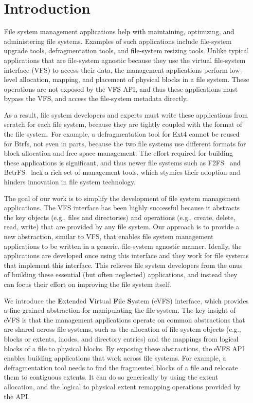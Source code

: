 \section{Introduction\label{sec:Introduction}}
File system management applications help with maintaining, optimizing, and administering file systems. Examples of such applications include file-system upgrade tools, defragmentation tools, and file-system resizing tools. Unlike typical applications that are file-system agnostic because they use the virtual file-system interface (VFS) to access their data, the management applications perform low-level allocation, mapping, and placement of physical blocks in a file system. These operations are not exposed by the VFS API, and thus these applications must bypass the VFS, and access the file-system metadata directly.

As a result, file system developers and experts must write these applications from scratch for each file system, because they are tightly coupled with the format of the file system. For example, a defragmentation tool for Ext4 cannot be reused for Btrfs, not even in parts, because the two file systems use different formats for block allocation and free space management. The effort required for building these applications is significant, and thus newer file systems such as F2FS~\cite{lee2015f2fs} and BetrFS~\cite{betrfs-2015-tos} lack a rich set of management tools, which stymies their adoption and hinders innovation in file system technology.

The goal of our work is to simplify the development of file system management applications. The VFS interface has been highly successful because it abstracts the key objects (e.g., files and directories) and operations (e.g., create, delete, read, write) that are provided by any file system. Our approach is to provide a new abstraction, similar to VFS, that enables file system management applications to be written in a generic, file-system agnostic manner. Ideally, the applications are developed once using this interface and they work for file systems that implement this interface.  This relieves file system developers from the onus of building these essential (but often neglected) applications, and instead they can focus their effort on improving the file system itself.

We introduce the \textbf{E}xtended \textbf{V}irtual \textbf{F}ile \textbf{S}ystem (eVFS) interface, which provides a fine-grained abstraction for manipulating the file system. The key insight of eVFS is that the management applications operate on common abstractions that are shared across file systems, such as the allocation of file system objects (e.g., blocks or extents, inodes, and directory entries) and the mappings from logical blocks of a file to physical blocks. By exposing these abstractions, the eVFS API enables building applications that work across file systems. For example, a defragmentation tool needs to find the fragmented blocks of a file and relocate them to contiguous extents. It can do so generically by using the extent allocation, and the logical to physical extent remapping operations provided by the API.

